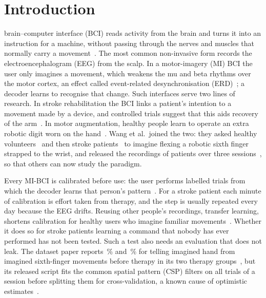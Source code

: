 \section{Introduction}
\label{sec:intro}

 brain--computer interface (BCI) reads activity from the brain and turns it
into an instruction for a machine, without passing through the nerves and muscles that
normally carry a movement~\cite{wolpaw2002}. The most common non-invasive form records the
electroencephalogram (EEG) from the scalp. In a motor-imagery (MI) BCI the user only imagines
a movement, which weakens the mu and beta rhythms over the motor cortex, an effect called
event-related desynchronisation (ERD)~\cite{pfurtscheller1999,pfurtscheller2001}; a decoder
learns to recognise that change. Such interfaces serve two lines of research. In stroke
rehabilitation the BCI links a patient's intention to a movement made by a device, and
controlled trials suggest that this aids recovery of the arm~\cite{cervera2018,biasiucci2018}.
In motor augmentation, healthy people learn to operate an extra robotic digit worn on the
hand~\cite{kieliba2021,eden2022}. Wang et al.\ joined the two: they asked healthy
volunteers~\cite{wang2024jbhi} and then stroke patients~\cite{wang2024tnsre} to imagine flexing
a robotic sixth finger strapped to the wrist, and released the recordings of \nSubjects{}
patients over three sessions~\cite{wang2026dataset}, so that others can now study the paradigm.

Every MI-BCI is calibrated before use: the user performs labelled trials from which the
decoder learns that person's pattern~\cite{lotte2015}. For a stroke patient each minute of
calibration is effort taken from therapy, and the step is usually repeated every day because
the EEG drifts. Reusing other people's recordings, transfer learning, shortens calibration for
healthy users who imagine familiar movements~\cite{zanini2018,he2020,wu2022review}. Whether it
does so for stroke patients learning a command that nobody has ever performed has not been
tested.
Such a test also needs an evaluation that does not leak. The dataset paper reports
\rqOnePublishedGroupBCspLda\,\% and \rqOnePublishedGroupTCspLda\,\% for telling imagined hand
from imagined sixth-finger movements before therapy in its two therapy
groups~\cite{wang2026dataset}, but its released
script fits the common spatial pattern (CSP) filters on all trials of a session before
splitting them for cross-validation, a known cause of optimistic
estimates~\cite{kapoor2023,brookshire2024}.

